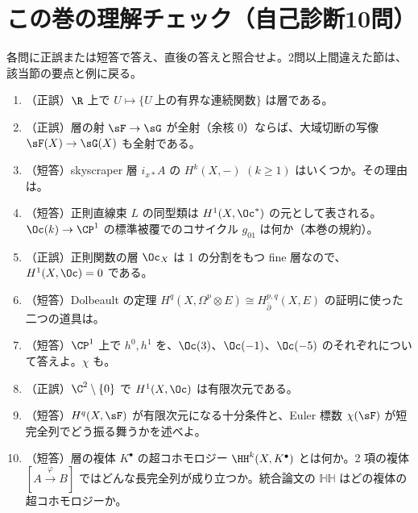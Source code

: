 \section{この巻の理解チェック（自己診断10問）}\label{sec:check}
各問に正誤または短答で答え、直後の答えと照合せよ。2問以上間違えた節は、該当節の要点と例に戻る。

\begin{enumerate}[label=\textbf{Q\arabic*.},leftmargin=2.4em]
\item（正誤）$\R$ 上で $U\mapsto\{U\ \text{上の有界な連続関数}\}$ は層である。
\item（正誤）層の射 $\sF\to\sG$ が全射（余核 $0$）ならば、大域切断の写像 $\sF(X)\to\sG(X)$ も全射である。
\item（短答）skyscraper 層 $i_{x*}A$ の $H^k(X,-)$ $(k\ge1)$ はいくつか。その理由は。
\item（短答）正則直線束 $L$ の同型類は $H^1(X,\Oc^*)$ の元として表される。$\Oc(k)\to\CP^1$ の標準被覆でのコサイクル $g_{01}$ は何か（本巻の規約）。
\item（正誤）正則関数の層 $\Oc_X$ は 1 の分割をもつ fine 層なので、$H^1(X,\Oc)=0$ である。
\item（短答）Dolbeault の定理 $H^q(X,\Omega^p\otimes E)\cong H^{p,q}_{\bar\partial}(X,E)$ の証明に使った二つの道具は。
\item（短答）$\CP^1$ 上で $h^0,h^1$ を、$\Oc(3)$、$\Oc(-1)$、$\Oc(-5)$ のそれぞれについて答えよ。$\chi$ も。
\item（正誤）$\C^2\setminus\{0\}$ で $H^1(X,\Oc)$ は有限次元である。
\item（短答）$H^q(X,\sF)$ が有限次元になる十分条件と、Euler 標数 $\chi(\sF)$ が短完全列でどう振る舞うかを述べよ。
\item（短答）層の複体 $K^\bullet$ の超コホモロジー $\HH^k(X,K^\bullet)$ とは何か。2 項の複体 $[A\xrightarrow{\varphi}B]$ ではどんな長完全列が成り立つか。統合論文の $\mathbb{HH}$ はどの複体の超コホモロジーか。
\end{enumerate}
